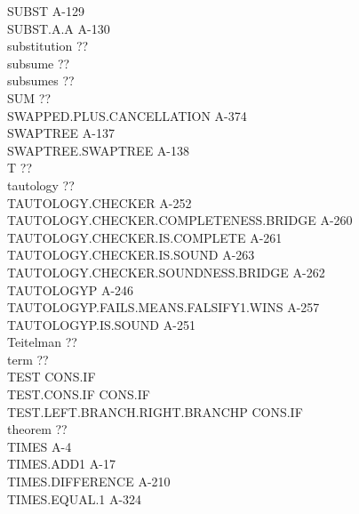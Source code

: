 \documentclass[10pt]{book}
\newenvironment{pubasis}{\begin{flushleft}}{\end{flushleft}}
\begin{document}
\begin{pubasis}
SUBST                                        A-129\\
SUBST.A.A                                    A-130\\
substitution                                 ??\\
subsume                                      ??\\
subsumes                                     ??\\
SUM                                          ??\\
SWAPPED.PLUS.CANCELLATION                    A-374\\
SWAPTREE                                     A-137\\
SWAPTREE.SWAPTREE                            A-138\\
T                                            ??\\
tautology                                    ??\\
TAUTOLOGY.CHECKER                            A-252\\
TAUTOLOGY.CHECKER.COMPLETENESS.BRIDGE        A-260\\
TAUTOLOGY.CHECKER.IS.COMPLETE                A-261\\
TAUTOLOGY.CHECKER.IS.SOUND                   A-263\\
TAUTOLOGY.CHECKER.SOUNDNESS.BRIDGE           A-262\\
TAUTOLOGYP                                   A-246\\
TAUTOLOGYP.FAILS.MEANS.FALSIFY1.WINS         A-257\\
TAUTOLOGYP.IS.SOUND                          A-251\\
Teitelman                                    ??\\
term                                         ??\\
TEST                                         CONS.IF\\
TEST.CONS.IF                                 CONS.IF\\
TEST.LEFT.BRANCH.RIGHT.BRANCHP               CONS.IF\\
theorem                                      ??\\
TIMES                                        A-4\\
TIMES.ADD1                                   A-17\\
TIMES.DIFFERENCE                             A-210\\
TIMES.EQUAL.1                                A-324\\

\end{pubasis}
\end{document}
